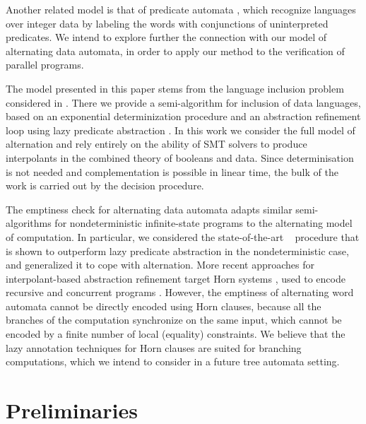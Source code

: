 \documentclass[10pt,conference,letterpaper,twocolumn]{IEEEtran}
\begin{document}

Another related model is that of predicate automata \cite{Farzan15},
which recognize languages over integer data by labeling the words with
conjunctions of uninterpreted predicates. We intend to explore further
the connection with our model of alternating data automata, in order
to apply our method to the verification of parallel programs.

The model presented in this paper stems from the language inclusion
problem considered in \cite{Tacas16}. There we provide a
semi-algorithm for inclusion of data languages, based on an
exponential determinization procedure and an abstraction refinement
loop using lazy predicate abstraction \cite{blast}. In this work we
consider the full model of alternation and rely entirely on the
ability of SMT solvers to produce interpolants in the combined theory
of booleans and data. Since determinisation is not needed and
complementation is possible in linear time, the bulk of the work is
carried out by the decision procedure.

The emptiness check for alternating data automata adapts similar
semi-algorithms for nondeterministic infinite-state programs to the
alternating model of computation. In particular, we considered the
state-of-the-art \impact~ procedure \cite{mcmillan06} that is shown to
outperform lazy predicate abstraction \cite{blast} in the
nondeterministic case, and generalized it to cope with
alternation. More recent approaches for interpolant-based abstraction
refinement target Horn systems \cite{McMillan14,Hoder12}, used to
encode recursive and concurrent programs
\cite{Grebenshchikov12}. However, the emptiness of alternating word
automata cannot be directly encoded using Horn clauses, because all
the branches of the computation synchronize on the same input, which
cannot be encoded by a finite number of local (equality)
constraints. We believe that the lazy annotation techniques for Horn
clauses are suited for branching computations, which we intend to
consider in a future tree automata setting.

\section{Preliminaries}
\end{document}
